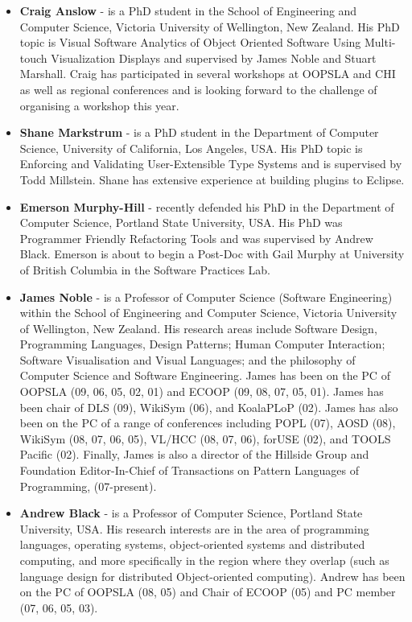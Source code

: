 \documentclass{acm_proc_article-sp}
\begin{document}
\begin{itemize}
\item \textbf{Craig Anslow} - is a PhD student in the School of Engineering and Computer Science, Victoria University of Wellington, New Zealand. His PhD topic is Visual Software Analytics of Object Oriented Software Using Multi-touch Visualization Displays and supervised by James Noble and Stuart Marshall. Craig has participated in several workshops at OOPSLA and CHI as well as regional conferences and is looking forward to the challenge of organising a workshop this year. 

\item \textbf{Shane Markstrum} - is a PhD student in the Department of Computer Science, University of California, Los Angeles, USA. His PhD topic is Enforcing and Validating User-Extensible Type Systems and is supervised by Todd Millstein. Shane has extensive experience at building plugins to Eclipse.

\item \textbf{Emerson Murphy-Hill} - recently defended his PhD in the Department of Computer Science, Portland State University, USA. His PhD was Programmer Friendly Refactoring Tools and was supervised by Andrew Black. Emerson is about to begin a Post-Doc with Gail Murphy at University of British Columbia in the Software Practices Lab.

\item \textbf{James Noble} - is a Professor of Computer Science (Software Engineering) within the School of 
Engineering and Computer Science, Victoria University of Wellington, New Zealand. 
His research areas include Software Design, Programming Languages, Design Patterns; 
Human Computer Interaction; Software Visualisation and Visual Languages; and the philosophy of Computer Science and Software Engineering. James has been on the PC of OOPSLA (09, 06, 05, 02, 01) and ECOOP (09, 08, 07,  05, 01). James has been chair of DLS (09), WikiSym (06), and KoalaPLoP (02). James has also been on the PC of a range of conferences including POPL (07), AOSD (08), WikiSym (08, 07, 06, 05), VL/HCC (08, 07, 06), forUSE (02), and TOOLS Pacific (02). Finally, James is also a director of the Hillside Group and Foundation Editor-In-Chief of Transactions on Pattern Languages of Programming, (07-present).

\item \textbf{Andrew Black} - is a Professor of Computer Science, Portland State University, USA. His research interests are in the area of programming languages, operating systems, object-oriented systems and distributed computing, and more specifically in the region where they overlap (such as language design for distributed Object-oriented computing). Andrew has been on the PC of OOPSLA (08, 05) and Chair of ECOOP (05) and PC member (07, 06, 05, 03).


\end{itemize}
\end{document}
